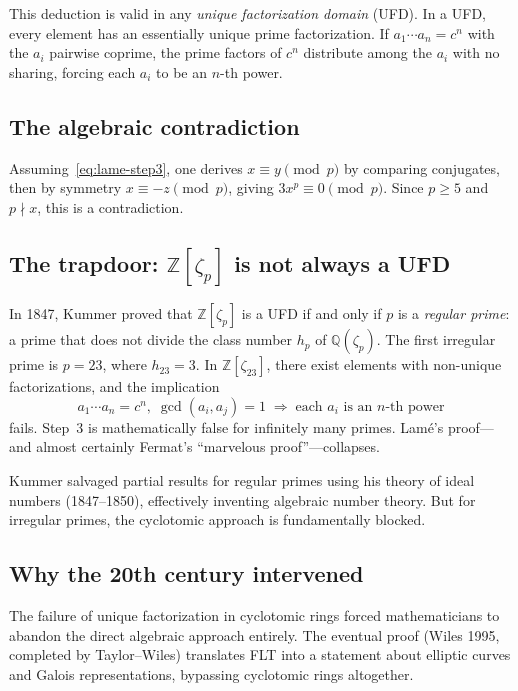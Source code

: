 \documentclass[11pt,a4paper]{article}
\theoremstyle{plain}
\theoremstyle{definition}
\newcommand{\Z}{\mathbb{Z}}
\newcommand{\Q}{\mathbb{Q}}
\begin{document}
This deduction is valid in any \emph{unique factorization domain} (UFD).
In a UFD, every element has an essentially unique prime factorization.
If $a_1 \cdots a_n = c^n$ with the $a_i$ pairwise coprime, the prime factors of $c^n$ distribute among the $a_i$ with no sharing, forcing each $a_i$ to be an $n$-th power.

\subsection*{The algebraic contradiction}

Assuming~\eqref{eq:lame-step3}, one derives $x \equiv y \pmod{p}$ by comparing conjugates, then by symmetry $x \equiv -z \pmod{p}$, giving $3x^p \equiv 0 \pmod{p}$.
Since $p \geq 5$ and $p \nmid x$, this is a contradiction.

\subsection*{The trapdoor: $\Z[\zeta_p]$ is not always a UFD}

In 1847, Kummer proved that $\Z[\zeta_p]$ is a UFD if and only if $p$ is a \emph{regular prime}: a prime that does not divide the class number $h_p$ of $\Q(\zeta_p)$.
The first irregular prime is $p = 23$, where $h_{23} = 3$.
In $\Z[\zeta_{23}]$, there exist elements with non-unique factorizations, and the implication
\[
a_1 \cdots a_n = c^n,\; \gcd(a_i, a_j) = 1 \;\Longrightarrow\; \text{each } a_i \text{ is an } n\text{-th power}
\]
fails.
Step~3 is mathematically false for infinitely many primes.
Lam\'e's proof---and almost certainly Fermat's ``marvelous proof''---collapses.

Kummer salvaged partial results for regular primes using his theory of ideal numbers (1847--1850), effectively inventing algebraic number theory.
But for irregular primes, the cyclotomic approach is fundamentally blocked.

\subsection*{Why the 20th century intervened}

The failure of unique factorization in cyclotomic rings forced mathematicians to abandon the direct algebraic approach entirely.
The eventual proof (Wiles 1995, completed by Taylor--Wiles) translates FLT into a statement about elliptic curves and Galois representations, bypassing cyclotomic rings altogether.
\end{document}
